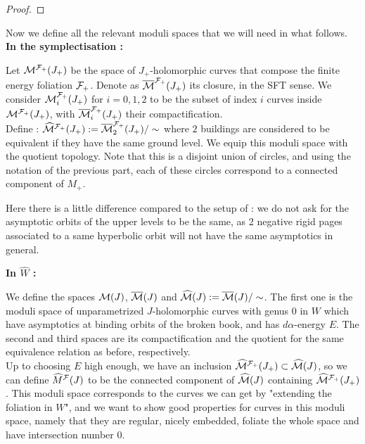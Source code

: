 \documentclass[../main.tex]{subfiles}
\begin{document}
\begin{proof}

\end{proof}


Now we define all the relevant moduli spaces that we will need in what follows.\\

\textbf{In the symplectisation :}

Let $\mathcal{M}^{\mathcal{F}_+}(J_+)$ be the space of $J_+$-holomorphic curves that compose the finite energy foliation $\mathcal{F}_+$. Denote as $\overline{\mathcal{M}}^{\mathcal{F}_+}(J_+)$ its closure, in the SFT sense. We consider $\mathcal{M}^{\mathcal{F}_+}_i(J_+)$ for $i = 0,1,2$ to be the subset of index $i$ curves inside $\mathcal{M}^{\mathcal{F}_+}(J_+)$, with 
$\overline{\mathcal{M}}^{\mathcal{F}_+}_i(J_+)$ their compactification. \\
Define : $\widehat{\mathcal{M}}^{\mathcal{F}_+}(J_+) := \overline{\mathcal{M}}_2^{\mathcal{F}_+}(J_+) / \sim $ where $2$ buildings are considered to be equivalent if they have the same ground level. We equip this moduli space with the quotient topology. Note that this is a disjoint union of circles, and using the notation of the previous part, each of these circles correspond to a connected component of $M_+$. 

\begin{remark}
    Here there is a little difference compared to the setup of \cite{SOBD2} : we do not ask for the asymptotic orbits of the upper levels to be the same, as 2 negative rigid pages associated to a same hyperbolic orbit will not have the same asymptotics in general. 
\end{remark}

\textbf{In $\widehat{W}$ :} 

We define the spaces $\mathcal{M}(J)$, $\overline{\mathcal{M}}(J)$ and $\widehat{\mathcal{M}}(J) := \overline{\mathcal{M}}(J)/\sim$. The first one is the moduli space of unparametrized $J$-holomorphic curves with genus $0$ in $W$ which have asymptotics at binding orbits of the broken book, and has $d\alpha$-energy $E$. The second and third spaces are its compactification and the quotient for the same equivalence relation as before, respectively.\\
Up to choosing $E$ high enough, we have an inclusion $\widehat{\mathcal{M}}^{\mathcal{F}_+}(J_+)\subset \widehat{\mathcal{M}}(J)$, so we can define $\widehat{M}^{\mathcal{F}}(J)$ to be the connected component of $\widehat{\mathcal{M}}(J)$ containing $\widehat{\mathcal{M}}^{\mathcal{F}_+}(J_+)$. This moduli space corresponds to the curves we can get by "extending the foliation in $W$", and we want to show good properties for curves in this moduli space, namely that they are regular, nicely embedded, foliate the whole space and have intersection number $0$. \\
\end{document}
